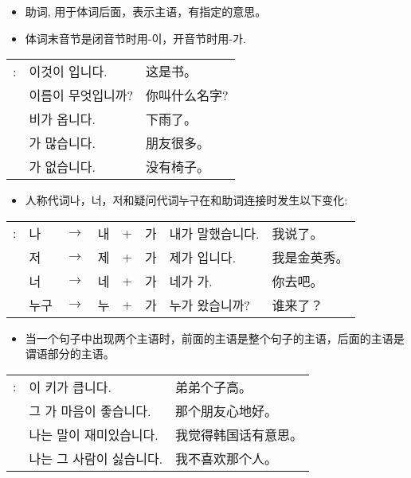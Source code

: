 \begin{grammar}
    \begin{grammarsect}[-이/-가]
        \begin{itemize}
            \item 助词, 用于体词后面，表示主语，有指定的意思。
            \item 体词末音节是闭音节时用-이，开音节时用-가.
        \end{itemize}
        \begin{tabular}{lll}
            \ruby{例}{예}:& 이것이 \ruby{冊}{책}입니다.&这是书。\\
            &이름이 무엇입니까?&你叫什么名字?\\
            &비가 옵니다.&下雨了。\\
            &\ruby{親舊}{친구}가 많습니다.&朋友很多。\\
            &\ruby{椅子}{의자}가 없습니다.&没有椅子。
        \end{tabular}
        \begin{itemize}
            \item 人称代词나，너，저和疑问代词누구在和助词连接时发生以下变化:
        \end{itemize}
        \begin{tabular}{llllllll}
            \ruby{例}{예}:&나 &$\to$&내&+&가&내가 말했습니다.&我说了。\\
            &저&$\to$&제&+ &가 &제가 \ruby{金英秀}{김영수}입니다. &我是金英秀。\\
            &너& $\to$ &네 &+ &가 &네가 가. &你去吧。\\
            &누구 &$\to$&누& + &가 &누가 왔습니까? &谁来了？\\
        \end{tabular}
        \begin{itemize}
            \item 当一个句子中出现两个主语时，前面的主语是整个句子的主语，后面的主语是谓语部分的主语。
        \end{itemize}
        \begin{tabular}{lll}
            \ruby{例}{예}: &\ruby{同生}{동생}이 키가 큽니다.&弟弟个子高。\\
            &그 \ruby{親舊}{친구}가 마음이 좋습니다.&那个朋友心地好。\\
            &나는 \ruby{韓國}{한국}말이 재미있습니다.&我觉得韩国话有意思。\\
            &나는 그 사람이 싫습니다.&我不喜欢那个人。\\

\end{tabular}
\end{grammarsect}
\end{grammar}
